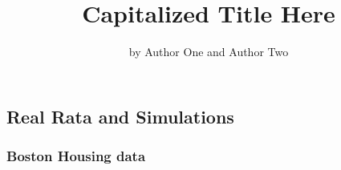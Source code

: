 \title{Capitalized Title Here}
\author{by Author One and Author Two}

\maketitle


\hypertarget{real-rata-and-simulations}{%
\subsection{Real Rata and Simulations}\label{real-rata-and-simulations}}

\hypertarget{boston-housing-data}{%
\subsubsection{Boston Housing data}\label{boston-housing-data}}

